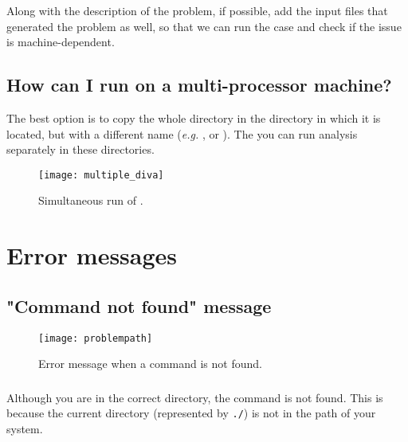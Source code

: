 Along with the description of the problem, if possible, add the input files that generated the problem as well, so that we can run the case and check if the issue is machine-dependent. 

\subsection{How can I run \diva on a multi-processor machine?}

The best option is to copy the whole directory  in the directory in which it is located, but with a different name (\textit{e.g.} , or ). The you can run \diva analysis separately in these directories. 


\begin{figure}[htpb]
\centering
\texttt{[image: multiple\_diva]}
\caption{Simultaneous run of \diva.}
\end{figure}


\section{Error messages}

\subsection{"Command not found" message}


\begin{figure}[htpb]
\centering
\texttt{[image: problempath]}
\caption{Error message when a command is not found.}
\end{figure}

\subsubsection{\question}

Although you are in the correct directory, the command is not found. This is because the current directory (represented by \texttt{./}) is not in the path of your system. 

\subsubsection{\answer}

